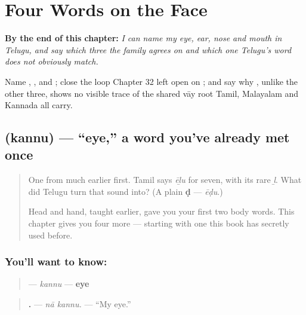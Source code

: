 
\chapter{Four Words on the Face}
\label{ch:te-face-words}

\begin{chapteropening}
\textbf{By the end of this chapter:} \emph{I can name my eye, ear, nose and mouth in Telugu, and say which three the family agrees on and which one Telugu's word does not obviously match.}

Name , ,  and ; close the loop Chapter 32 left open on ; and say why , unlike the other three, shows no visible trace of the shared vāy root Tamil, Malayalam and Kannada all carry.
\end{chapteropening}

\section[\texorpdfstring{\te{కన్ను} (kannu)}{కన్ను (kannu)}]{ (kannu) — \textquotedblleft{}eye,\textquotedblright{} a word you've already met once}

\label{lesson:TE-C37-kannu}



\begin{quote}
One from much earlier first. Tamil says \emph{ēḻu} for seven, with its rare \emph{ḻ}. What did Telugu turn that sound into? (A plain \textbf{ḍ} — \emph{ēḍu}.)

Head and hand, taught earlier, gave you your first two body words. This chapter gives you four more — starting with one this book has secretly used before.
\end{quote}

\subsection*{You'll want to know: }
\begin{quote}
\textbf{} — \emph{kannu} — \textbf{eye}
\end{quote}

\begin{quote}
\textbf{ .} — \emph{nā kannu.} — \textquotedblleft{}My eye.\textquotedblright{}
\end{quote}

